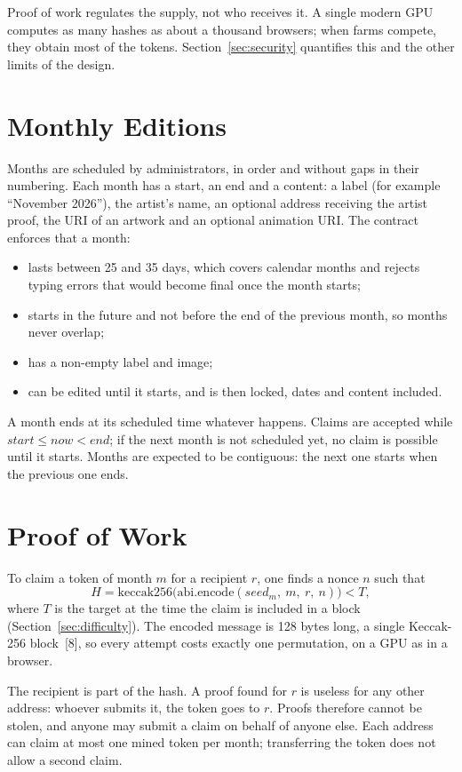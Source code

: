 \documentclass[10pt,letterpaper]{article}
\begin{document}
Proof of work regulates the supply, not who receives it. A single modern GPU computes as many hashes as about a
thousand browsers; when farms compete, they obtain most of the tokens. Section~\ref{sec:security} quantifies this
and the other limits of the design.

\section{Monthly Editions}

Months are scheduled by administrators, in order and without gaps in their numbering. Each month has a start, an
end and a content: a label (for example ``November 2026''), the artist's name, an optional address receiving the
artist proof, the URI of an artwork and an optional animation URI. The contract enforces that a month:
\begin{itemize}
  \item lasts between 25 and 35 days, which covers calendar months and rejects typing errors that would become
        final once the month starts;
  \item starts in the future and not before the end of the previous month, so months never overlap;
  \item has a non-empty label and image;
  \item can be edited until it starts, and is then locked, dates and content included.
\end{itemize}

A month ends at its scheduled time whatever happens. Claims are accepted while
$\mathit{start} \le \mathit{now} < \mathit{end}$; if the next month is not scheduled yet, no claim is possible
until it starts. Months are expected to be contiguous: the next one starts when the previous one ends.

\section{Proof of Work}

To claim a token of month $m$ for a recipient $r$, one finds a nonce $n$ such that
\[
  H = \mathrm{keccak256}\big(\mathrm{abi.encode}(\mathit{seed}_m,\ m,\ r,\ n)\big) < T ,
\]
where $T$ is the target at the time the claim is included in a block (Section~\ref{sec:difficulty}). The encoded
message is 128 bytes long, a single Keccak-256 block~[8], so every attempt costs exactly one permutation, on a
GPU as in a browser.

The recipient is part of the hash. A proof found for $r$ is useless for any other address: whoever submits it,
the token goes to $r$. Proofs therefore cannot be stolen, and anyone may submit a claim on behalf of anyone else.
Each address can claim at most one mined token per month; transferring the token does not allow a second claim.
\end{document}
